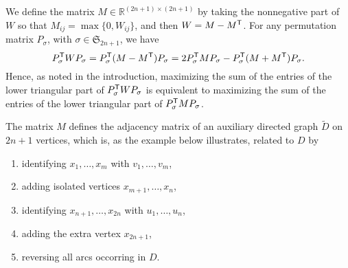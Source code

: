 \documentclass{amsart}
\newcommand{\R}{\mathbb{R}}
\newcommand{\permS}{\mathfrak{S}}
\begin{document}
We define the matrix $M \in \R^{(2n+1) \times (2n+1)}$ by taking the
nonnegative part of $W$ so that $M_{ij} = \max\{0,W_{ij}\}$, and then
$W = M - M^{\sf T}$. For any permutation matrix $P_{\sigma}$, with
$\sigma \in \permS_{2n+1}$, we have
\[
  P_{\sigma}^{\sf T} W P_{\sigma} =   P_{\sigma}^{\sf T} (M - M^{\sf
    T}) P_{\sigma} = 2  P_{\sigma}^{\sf T} M P_{\sigma} -
  P_{\sigma}^{\sf T} (M + M^{\sf T}) P_{\sigma}.
\]
Hence, as noted in the introduction, maximizing the sum of the entries
of the lower triangular part of $P_{\sigma}^{\sf T} W P_{\sigma}$ is
equivalent to maximizing the sum of the entries of the lower
triangular part of $P_{\sigma}^{\sf T} M P_{\sigma}$.

\smallskip

The matrix $M$ defines the adjacency matrix of an auxiliary directed
graph $\tilde{D}$ on $2n+1$ vertices, which is, as the example below illustrates, related to $D$ by
\begin{enumerate}
\item identifying $x_1, \ldots, x_m$ with $v_1, \ldots, v_m$,
\item adding isolated vertices $x_{m+1}, \ldots, x_n$,
\item identifying $x_{n+1},\ldots, x_{2n}$ with $u_1, \ldots, u_n$,
\item adding the extra vertex $x_{2n+1}$,
\item reversing all arcs occorring in $D$.
\end{enumerate}
\end{document}
